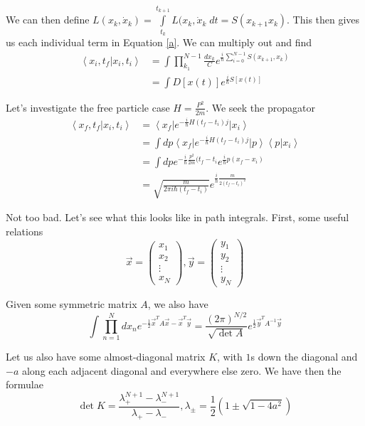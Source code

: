 \documentclass[10pt]{report}
\newcommand{\bra}[1]{\left<#1\right|}
\newcommand{\ket}[1]{\left|#1\right>}
\newcommand{\dotp}[2]{\left<#1\left.\right|#2\right>}
\begin{document}
We can then define $L(x_k, \dot{x}_k) = \displaystyle\int\limits_{t_k}^{t_{k+1}}L(x_k, \dot{x}_k\;dt = S(x_{k+1}x_k)$. This then gives us each individual term in Equation \ref{a}. We can multiply out and find
\begin{align}
	\dotp{x_i, t_f}{x_i, t_i} &= \int \prod_{k_1}^{N-1}\frac{dx_k}{C}e^{\frac{i}{\hbar} \sum_{i=0}^{N-1}S(x_{k+1},x_k)}\\
	&= \int D[x(t)] e^{\frac{i}{\hbar} S[x(t)]}
\end{align}

Let's investigate the free particle case $H = \frac{P^2}{2m}$. We seek the propagator
\begin{align}
	\dotp{x_f, t_f}{x_i, t_i} &= \bra{x_f} e^{-\frac{i}{\hbar}H(t_f - t_i)j}\ket{x_i}\\
	&=\int dp \bra{x_f} e^{-\frac{i}{\hbar}H(t_f - t_i)j}\ket{p}\dotp{p}{x_i}\\
	&= \int dp e^{-\frac{i}{\hbar}\frac{p^2}{2m}(t_f - t_i}e^{\frac{i}{\hbar}p(x_f - x_i)}\\
	&= \sqrt{\frac{m}{2\pi i \hbar(t_f - t_i)}}e^{\frac{i}{\hbar}\frac{m}{2(t_f - t_i)^2}}
\end{align}

Not too bad. Let's see what this looks like in path integrals. First, some useful relations
$$\vec{x} = \begin{pmatrix}x_1\\x_2\\\vdots\\x_N\end{pmatrix}, \vec{y} = \begin{pmatrix}y_1\\y_2\\\vdots\\y_N\end{pmatrix}$$

Given some symmetric matrix $A$, we also have
$$\int \prod_{n=1}^N dx_n e^{-\frac{1}{2}\vec{x}^T A \vec{x} - \vec{x}^T \vec{y}} = \frac{(2\pi)^{N/2}}{\sqrt{\det A}}e^{\frac{1}{2}\vec{y}^T A^{-1}\vec{y}}$$

Let us also have some almost-diagonal matrix $K$, with $1$s down the diagonal and $-a$ along each adjacent diagonal and everywhere else zero. We have then the formulae
$$\det K = \frac{\lambda_+^{N+1} - \lambda_{-}^{N+1}}{\lambda_+ - \lambda_-}, \lambda_{\pm} = \frac{1}{2}\left( 1 \pm \sqrt{1-4a^2} \right)$$
\end{document}
